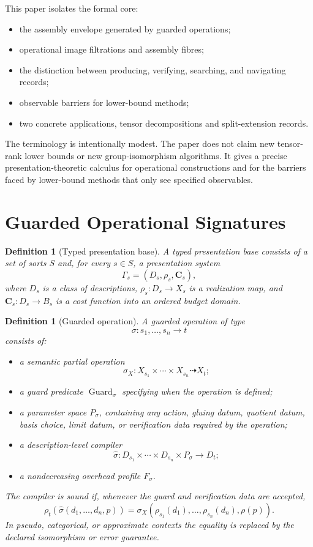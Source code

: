 \documentclass[11pt]{article}
\newtheorem{definition}[theorem]{Definition}
\begin{document}
This paper isolates the formal core:
\begin{itemize}[leftmargin=2em]
\item the assembly envelope generated by guarded operations;
\item operational image filtrations and assembly fibres;
\item the distinction between producing, verifying, searching, and navigating records;
\item observable barriers for lower-bound methods;
\item two concrete applications, tensor decompositions and split-extension records.
\end{itemize}

The terminology is intentionally modest.  The paper does not claim new tensor-rank lower bounds or new group-isomorphism algorithms.  It gives a precise presentation-theoretic calculus for operational constructions and for the barriers faced by lower-bound methods that only see specified observables.

\section{Guarded Operational Signatures}

\begin{definition}[Typed presentation base]
A typed presentation base consists of a set of sorts \(S\) and, for every \(s\in S\), a presentation system
\[
\Gamma_s=(D_s,\rho_s,\mathbf C_s),
\]
where \(D_s\) is a class of descriptions, \(\rho_s:D_s\to X_s\) is a realization map, and \(\mathbf C_s:D_s\to B_s\) is a cost function into an ordered budget domain.
\end{definition}

\begin{definition}[Guarded operation]
A guarded operation of type
\[
\sigma:s_1,\ldots,s_n\to t
\]
consists of:
\begin{itemize}[leftmargin=2em]
\item a semantic partial operation
\[
\sigma_X:X_{s_1}\times\cdots\times X_{s_n}\dashrightarrow X_t;
\]
\item a guard predicate \(\operatorname{Guard}_{\sigma}\) specifying when the operation is defined;
\item a parameter space \(P_{\sigma}\), containing any action, gluing datum, quotient datum, basis choice, limit datum, or verification data required by the operation;
\item a description-level compiler
\[
\widehat{\sigma}:D_{s_1}\times\cdots\times D_{s_n}\times P_{\sigma}\to D_t;
\]
\item a nondecreasing overhead profile \(F_{\sigma}\).
\end{itemize}
The compiler is sound if, whenever the guard and verification data are accepted,
\[
\rho_t(\widehat{\sigma}(d_1,\ldots,d_n,p))
=
\sigma_X(\rho_{s_1}(d_1),\ldots,\rho_{s_n}(d_n),\rho(p)).
\]
In pseudo, categorical, or approximate contexts the equality is replaced by the declared isomorphism or error guarantee.
\end{definition}
\end{document}
